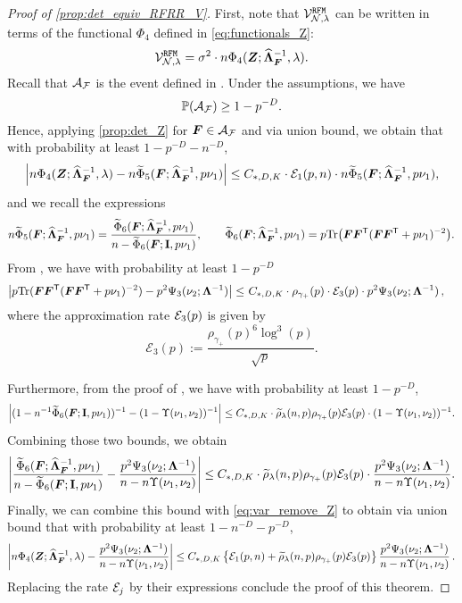 \begin{proof}[Proof of \cref{prop:det_equiv_RFRR_V}]
First, note that $\mathcal{V}_{\mathcal{N},\lambda}^{\tt RFM}$ can be written in terms of the functional $\Phi_4$ defined in \cref{eq:functionals_Z}:
\[
\mathcal{V}_{\mathcal{N},\lambda}^{\tt RFM} = \sigma^2 \cdot n \Phi_4 ( {\boldsymbol Z} ; \widehat{{\boldsymbol \Lambda}}^{-1}_{\boldsymbol F},\lambda).
\]
Recall that ${\mathcal A}_{\mathcal F}$ is the event defined in \citet[Eq. (79)]{defilippis2024dimension}. Under the assumptions, we have
\[
\mathbb{P} ({\mathcal A}_{\mathcal F}) \geq 1 - p^{-D}.
\]
Hence, applying \cref{prop:det_Z} for ${\boldsymbol F} \in {\mathcal A}_{\mathcal F}$ and via union bound, we obtain that with probability at least $1 - p^{-D} - n^{-D}$,
\begin{equation}\label{eq:var_remove_Z}
\left| n\Phi_4 ( {\boldsymbol Z} ; \widehat{{\boldsymbol \Lambda}}^{-1}_{\boldsymbol F},\lambda) - n\widetilde{\Phi}_5 ( {\boldsymbol F} ; \widehat{{\boldsymbol \Lambda}}^{-1}_{\boldsymbol F}, p\nu_1 )\right|  \leq C_{*,D,K} \cdot {\mathcal E}_1 (p,n) \cdot n\widetilde{\Phi}_5 ( {\boldsymbol F} ; \widehat{{\boldsymbol \Lambda}}^{-1}_{\boldsymbol F}, p\nu_1 ),
\end{equation}
and we recall the expressions
\[
n\widetilde{\Phi}_5 ( {\boldsymbol F} ; \widehat{{\boldsymbol \Lambda}}^{-1}_{\boldsymbol F}, p\nu_1 ) = \frac{\widetilde{\Phi}_6 ( {\boldsymbol F} ; \widehat{{\boldsymbol \Lambda}}^{-1}_{\boldsymbol F} , p\nu_1) }{n - \widetilde{\Phi}_6 ( {\boldsymbol F} ; {\mathbf I} , p\nu_1)}, \quad \quad \widetilde{\Phi}_6 ( {\boldsymbol F} ; \widehat{{\boldsymbol \Lambda}}^{-1}_{\boldsymbol F} , p\nu_1) = p{\rm Tr} \big( {\boldsymbol F} {\boldsymbol F}^{\mathsf T} ( {\boldsymbol F} {\boldsymbol F}^{\mathsf T} + p \nu_1)^{-2} \big).
\]
From \citet[Lemma B.11]{defilippis2024dimension}, we have with probability at least $1 - p^{-D}$
\[
\begin{aligned}
\left| p{\rm Tr} ({\boldsymbol F} {\boldsymbol F}^{\mathsf T} ( {\boldsymbol F} {\boldsymbol F}^{\mathsf T} + p\nu_1)^{-2} ) - p^2\Psi_3 ( \nu_2 ; {\boldsymbol \Lambda}^{-1} )\right| \leq&~ C_{*,D,K} \cdot \rho_{\gamma_+} (p) \cdot {\mathcal E}_3 (p) \cdot p^2\Psi_3 ( \nu_2 ; {\boldsymbol \Lambda}^{-1} )\,,
\end{aligned}
\]
where the approximation rate \({\mathcal E}_3 (p)\) is given by
\[
    \mathcal{E}_3(p) := \frac{\rho_{\gamma_+}(p)^6 \log^3(p)}{\sqrt{p}}.
\]


Furthermore, from the proof of \citet[Theorem B.12]{defilippis2024dimension}, we have with probability at least $1 - p^{-D}$,
\[
\left| (1 - n^{-1} \widetilde{\Phi}_6 ({\boldsymbol F}; {\mathbf I}, p\nu_1))^{-1} - (1 -  \Upsilon (\nu_1,\nu_2) )^{-1} \right| \leq C_{*,D,K} \cdot \widetilde{\rho}_\lambda (n,p) \rho_{\gamma_+} (p) {\mathcal E}_3 (p) \cdot  (1 -   \Upsilon (\nu_1,\nu_2))^{-1}.
\]
Combining those two bounds, we obtain
\[
\left| \frac{\widetilde{\Phi}_6 ( {\boldsymbol F} ; \widehat{{\boldsymbol \Lambda}}^{-1}_{\boldsymbol F} , p\nu_1) }{n - \widetilde{\Phi}_6 ( {\boldsymbol F} ; {\mathbf I} , p\nu_1)} - \frac{p^2\Psi_3 ( \nu_2 ; {\boldsymbol \Lambda}^{-1} )}{n - n\Upsilon (\nu_1,\nu_2)} \right| \leq C_{*,D,K} \cdot \widetilde{\rho}_\lambda (n,p) \rho_{\gamma_+} (p) {\mathcal E}_3 (p) \cdot \frac{p^2\Psi_3 ( \nu_2 ; {\boldsymbol \Lambda}^{-1} )}{n - n\Upsilon (\nu_1,\nu_2)}.
\]
Finally, we can combine this bound with \cref{eq:var_remove_Z} to obtain via union bound that with probability at least $1 - n^{-D} - p^{-D}$, 
\[
\left| n\Phi_4 ( {\boldsymbol Z} ; \widehat{{\boldsymbol \Lambda}}^{-1}_{\boldsymbol F},\lambda) - \frac{p^2\Psi_3 ( \nu_2 ; {\boldsymbol \Lambda}^{-1} )}{n - n\Upsilon (\nu_1,\nu_2)} \right| \leq C_{*,D,K} \left\{ {\mathcal E}_1 (p,n) + \widetilde{\rho}_\lambda (n,p) \rho_{\gamma_+} (p) {\mathcal E}_3 (p) \right\} \frac{p^2\Psi_3 ( \nu_2 ; {\boldsymbol \Lambda}^{-1} )}{n - n\Upsilon (\nu_1,\nu_2)}\,.
\]
Replacing the rate ${\mathcal E}_j$ by their expressions conclude the proof of this theorem.
\end{proof}

